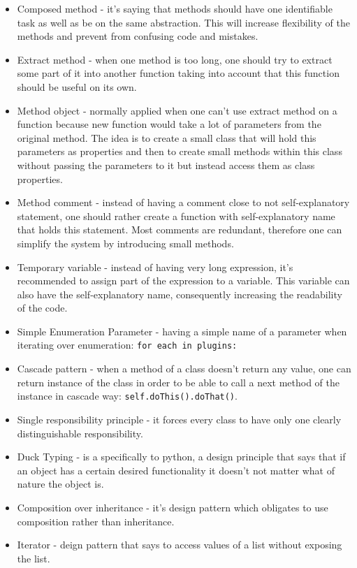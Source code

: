 {%
\begin{itemize}
	\item Composed method - it's saying that methods should
		have one identifiable task as well as be on the same abstraction.
		This will increase flexibility of the methods and prevent
		from confusing code and mistakes. \cite{beck1997smalltalk}
	\item Extract method - when one method is too long, one should try to
		extract some part of it into another function taking into account that this
		function should be useful on its own. \cite{1999:RID:311424}
	\item Method object -  normally applied when one can't use extract method
	 	on a function because new function would take a lot of parameters
		from the original method.
		The idea is to create a small class that will hold this parameters
		as properties and then to create small methods within this class without
		passing the parameters to it but instead access them as class properties.
		\cite{beck1997smalltalk}
	\item Method comment - instead of having a comment close to not
		self-explanatory statement, one should rather create a function
		with self-explanatory name that holds this statement.
		Most comments are redundant, therefore one can simplify
		the system by introducing small methods.
		\cite{beck1997smalltalk}
	\item Temporary variable - instead of having very long expression, it's recommended
		to assign part of the expression to a variable. This variable can also have
		the self-explanatory name, consequently increasing the readability of the code.\cite{beck1997smalltalk}
	\item Simple Enumeration Parameter - having a simple name of a parameter
		when iterating over enumeration: \lstinline{for each in plugins:} \cite{beck1997smalltalk}
	\item Cascade pattern - when a method of a class doesn't return any value,
		one can return instance of the class in order to be able to call a
		next method of the instance in cascade way: \lstinline{self.doThis().doThat()}.\cite{beck1997smalltalk}
	\item Single responsibility principle - it forces every class to have only one
		clearly distinguishable responsibility.\cite{martin2003agile}
	\item Duck Typing - is a specifically to python, a design principle that
		says that if an object has a certain desired functionality it doesn't not matter
		what of nature the object is.
	\item Composition over inheritance - it's design pattern which obligates
	 	to use composition rather than inheritance. \cite{Gamma:1995:DPE:186897}
	\item Iterator - deign pattern that says to access values of a list
	 	without exposing the list. \cite{Gamma:1995:DPE:186897}
\end{itemize}

}
